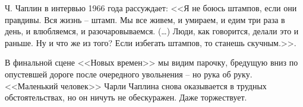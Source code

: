 Ч. Чаплин в интервью 1966 года рассуждает: <<Я не боюсь штампов, если они правдивы. Вся жизнь –
штамп. Мы все живем, и умираем, и едим три раза в день,  и влюбляемся, и разочаровываемся. (\ldots)
Люди, как говорится, делали это и раньше. Ну и что же из того? Если избегать штампов, то станешь
скучным.>>\autocite[][138]{chaplin2005}.

В финальной сцене <<Новых времен>> мы видим парочку, бредущую вниз по опустевшей дороге после
очередного увольнения -- но рука об руку. <<Маленький человек>>  Чарли Чаплина снова оказывается в
трудных обстоятельствах, но он ничуть не обескуражен. Даже торжествует.
